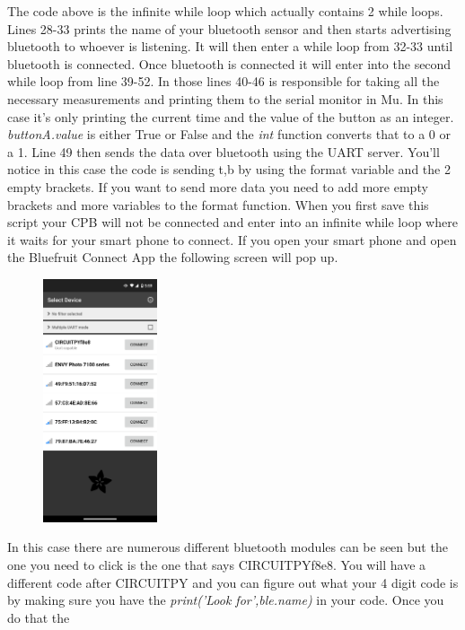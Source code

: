 The code above is the infinite while loop which actually contains 2
while loops. Lines 28-33 prints the name of your bluetooth sensor and
then starts advertising bluetooth to whoever is listening. It will
then enter a while loop from 32-33 until 
bluetooth is connected. Once bluetooth is connected it will enter into
the second while loop from line 39-52. In those lines 40-46 is
responsible for taking all the necessary measurements and printing
them to the serial monitor in Mu. In this case it's only printing the
current time and the value of the button as an integer. {\it
buttonA.value} is either True or False and the {\it int} function
converts that to a 0 or a 1. Line 49 then sends the data
over bluetooth using the UART server. You'll notice in this case the
code is sending t,b by
using the format variable and the 2 empty {} brackets. If you want to
send more data you need to add more empty brackets and more variables
to the format function. When you first save this script your CPB will
not be connected and enter into an infinite while loop where it waits
for your smart phone to connect. If you open your smart phone and open
the Bluefruit Connect App the following screen will pop up. 
\begin{figure}[H]
  \begin{center}
    \includegraphics[width=0.3\textwidth]{Figures/phoneapp1.png}
  \end{center}
\end{figure}
In this case there are numerous different bluetooth modules can be
seen but the one you need to click is the one that says
CIRCUITPYf8e8. You will have a different code after CIRCUITPY and you
can figure out what your 4 digit code is by making sure you have the
{\it print('Look for',ble.name)} in your code. Once you do that the
